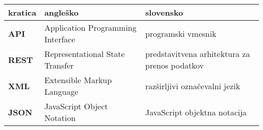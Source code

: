 \documentclass[a4paper, 12pt]{book}
\newcommand{\clearemptydoublepage}{\newpage{\pagestyle{empty}\cleardoublepage}}
\begin{document}
\begin{tabular}{l|l|p{5cm}}
  \textbf{kratica} & \textbf{angleško} & \textbf{slovensko} \\\hline
  \textbf{API} & Application Programming Interface & programski vmesnik \\
  \textbf{REST} & Representational State Transfer & predstavitvena arhitektura za prenos podatkov \\
  \textbf{XML} & Extensible Markup Language & razširljivi označevalni jezik \\
  \textbf{JSON} & JavaScript Object Notation & JavaScript objektna notacija \\
\end{tabular}



\thispagestyle{empty}

\clearemptydoublepage




\clearemptydoublepage



\clearemptydoublepage

\mainmatter
\setcounter{page}{1}
\pagestyle{fancy}








\end{document}
